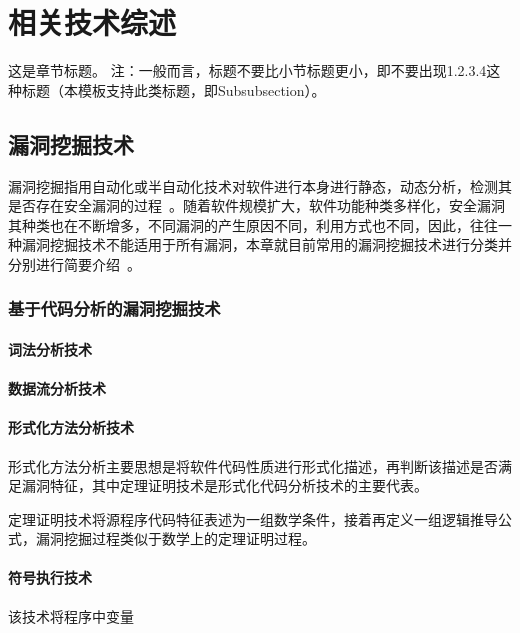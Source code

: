 \chapter{相关技术综述}
这是章节标题。
注：一般而言，标题不要比小节标题更小，即不要出现1.2.3.4这种标题（本模板支持此类标题，即Subsubsection）。

\section{漏洞挖掘技术}
漏洞挖掘指用自动化或半自动化技术对软件进行本身进行静态，动态分析，检测其是否存在安全漏洞的过程~\cite{刘剑2018软件与网络安全研究综述}。随着软件规模扩大，软件功能种类多样化，安全漏洞其种类也在不断增多，不同漏洞的产生原因不同，利用方式也不同，因此，往往一种漏洞挖掘技术不能适用于所有漏洞，本章就目前常用的漏洞挖掘技术进行分类并分别进行简要介绍~\cite{刘剑2018软件与网络安全研究综述,梅宏2009软件分析技术进展}。\\

\subsection{基于代码分析的漏洞挖掘技术}
\subsubsection{词法分析技术}

\subsubsection{数据流分析技术}

\subsubsection{形式化方法分析技术}
形式化方法分析主要思想是将软件代码性质进行形式化描述，再判断该描述是否满足漏洞特征，其中定理证明技术是形式化代码分析技术的主要代表。

定理证明技术将源程序代码特征表述为一组数学条件，接着再定义一组逻辑推导公式，漏洞挖掘过程类似于数学上的定理证明过程。\\

\subsubsection{符号执行技术}
该技术将程序中变量

